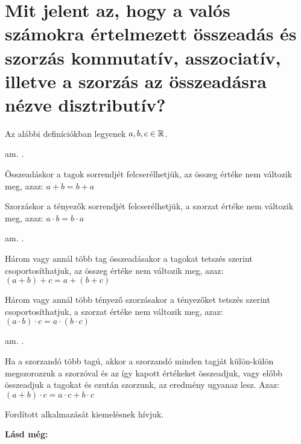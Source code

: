 
\section{Mit jelent az, hogy a valós számokra értelmezett összeadás és szorzás
kommutatív, asszociatív, illetve a szorzás az összeadásra nézve disztributív?}
\label{004}

Az alábbi definíciókban legyenek $a, b, c \in \mathbb{R}$.

\begin{defin}[Kommutativitás]
am. .

Összeadáskor a tagok sorrendjét felcserélhetjük, az összeg értéke nem változik
meg, azaz: $a + b = b + a$

Szorzáskor a tényezők sorrendjét felcserélhetjük, a szorzat értéke nem változik
meg, azaz: $a \cdot b = b \cdot a$
\end{defin}

\begin{defin}[Asszociativitás]
am. .

Három vagy annál több tag összeadásakor a tagokat tetszés szerint
csoportosíthatjuk, az összeg értéke nem változik meg, azaz:
$(a + b) + c = a + (b + c)$

Három vagy annál több tényező szorzásakor a tényezőket tetszés szerint
csoportosíthatjuk, a szorzat értéke nem változik meg, azaz:
$(a \cdot b) \cdot c = a \cdot (b \cdot c)$
\end{defin}

\begin{defin}[Disztributivitás]
am. .

Ha a szorzandó több tagú, akkor a szorzandó minden tagját külön-külön
megszorozzuk a szorzóval és az így kapott értékeket összeadjuk, vagy előbb
összeadjuk a tagokat és ezután szorzunk, az eredmény ugyanaz lesz. Azaz:
$(a + b) \cdot c = a \cdot c + b \cdot c$

Fordított alkalmazását kiemelésnek hívjuk.
\end{defin}

\textbf{Lásd még:}
